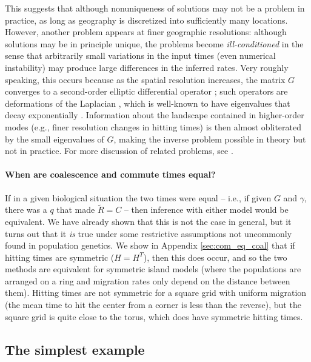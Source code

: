 \documentclass{article}
\newcommand{\comdist}{\widetilde{R}}
\begin{document}
This suggests that although nonuniqueness of solutions may not be a problem in practice,
as long as geography is discretized into sufficiently many locations.
However, another problem appears at finer geographic resolutions:
although solutions may be in principle unique,
the problems become \emph{ill-conditioned} 
in the sense that arbitrarily small variations in the input times
(even numerical instability)
may produce large differences in the inferred rates.
Very roughly speaking, this occurs because as the spatial resolution increases,
the matrix $G$ converges to a second-order elliptic differential operator \citep{pde};
such operators are deformations of the Laplacian \citep{laplacian},
which is well-known to have eigenvalues that decay exponentially \citep{laplacian_eigenvals}.
Information about the landscape contained in higher-order modes
(e.g., finer resolution changes in hitting times)
is then almost obliterated by the small eigenvalues of $G$,
making the inverse problem possible in theory but not in practice.
For more discussion of related problems, see \citet{badtruth,shape_of_a_pop,inverse_prob}.

\paragraph{When are coalescence and commute times equal?}
If in a given biological situation the two times were equal --
i.e., if given $G$ and $\gamma$, there was a $q$ that made $\comdist = C$ --
then inference with either model would be equivalent.
We have already shown that this is not the case in general,
but it turns out that it \emph{is} true
under some restrictive assumptions not uncommonly found in population genetics.
We show in Appendix \ref{sec:com_eq_coal} that
if hitting times are symmetric ($H = H^T$),
then this does occur,
and so the two methods are equivalent for symmetric island models
(where the populations are arranged on a ring 
and migration rates only depend on the distance between them).
Hitting times are not symmetric for a square grid with uniform migration
(the mean time to hit the center from a corner is less than the reverse),
but the square grid is quite close to the torus, which does have symmetric hitting times.


\subsection*{The simplest example}
\end{document}
